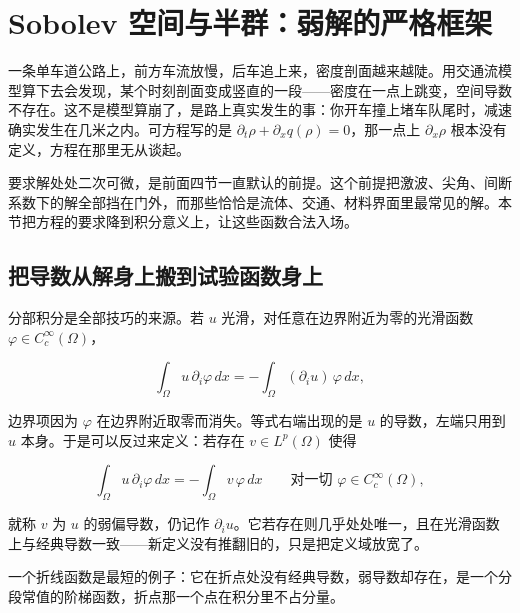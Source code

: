 \section{Sobolev 空间与半群：弱解的严格框架}
\label{sec:15-Differential-Equations-and-Dynamical-Systems/03-PDE-Introduction/05}

一条单车道公路上，前方车流放慢，后车追上来，密度剖面越来越陡。用交通流模型算下去会发现，某个时刻剖面变成竖直的一段——密度在一点上跳变，空间导数不存在。这不是模型算崩了，是路上真实发生的事：你开车撞上堵车队尾时，减速确实发生在几米之内。可方程写的是 \(\partial_t\rho+\partial_x q(\rho)=0\)，那一点上 \(\partial_x\rho\) 根本没有定义，方程在那里无从谈起。

要求解处处二次可微，是前面四节一直默认的前提。这个前提把激波、尖角、间断系数下的解全部挡在门外，而那些恰恰是流体、交通、材料界面里最常见的解。本节把方程的要求降到积分意义上，让这些函数合法入场。

\subsection{把导数从解身上搬到试验函数身上}

分部积分是全部技巧的来源。若 \(u\) 光滑，对任意在边界附近为零的光滑函数 \(\varphi\in C_c^\infty(\Omega)\)，

\[
\int_\Omega u\,\partial_i\varphi\,dx=-\int_\Omega(\partial_iu)\,\varphi\,dx ,
\]

边界项因为 \(\varphi\) 在边界附近取零而消失。等式右端出现的是 \(u\) 的导数，左端只用到 \(u\) 本身。于是可以反过来定义：若存在 \(v\in L^p(\Omega)\) 使得

\[
\int_\Omega u\,\partial_i\varphi\,dx=-\int_\Omega v\,\varphi\,dx
\qquad\text{对一切 }\varphi\in C_c^\infty(\Omega),
\]

就称 \(v\) 为 \(u\) 的弱偏导数，仍记作 \(\partial_iu\)。它若存在则几乎处处唯一，且在光滑函数上与经典导数一致——新定义没有推翻旧的，只是把定义域放宽了。

一个折线函数是最短的例子：它在折点处没有经典导数，弱导数却存在，是一个分段常值的阶梯函数，折点那一个点在积分里不占分量。

